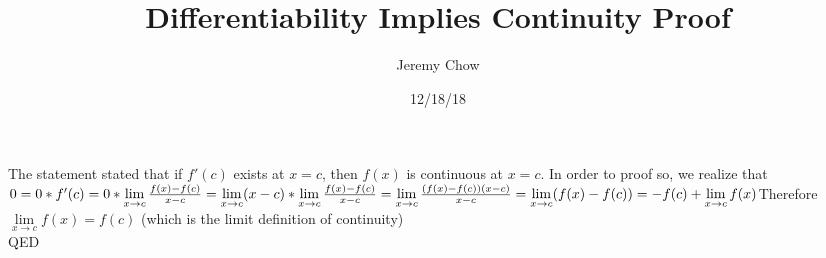 \documentclass[12pt]{article}
\title{Differentiability Implies Continuity Proof}
\author{Jeremy Chow}
\date{12/18/18}
\begin{document}
\maketitle
The statement stated that if $f'(c)$ exists at $x=c$, then $f(x)$ is continuous at $x=c$. In order to proof so, we realize that\\$0=0*f'(c)\\=0*\lim\limits_{x\to c}\frac{f(x)-f(c)}{x-c}\\=\lim\limits_{x\to c}(x-c)*\lim\limits_{x\to c}\frac{f(x)-f(c)}{x-c}\\=\lim\limits_{x\to c}\frac{(f(x)-f(c))(x-c)}{x-c}\\=\lim\limits_{x\to c}(f(x)-f(c))\\=-f(c)+\lim\limits_{x\to c}f(x)\\$Therefore\\$\lim\limits_{x\to c}f(x)=f(c)$ (which is the limit definition of continuity)\\QED
\end{document}
